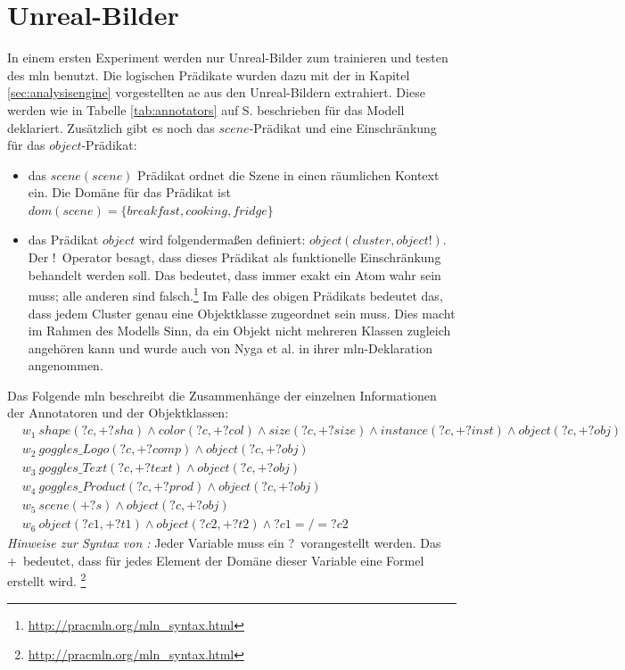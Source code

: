 \section{Unreal-Bilder}
\label{sec:onlyUnrealImages}
In einem ersten Experiment werden nur Unreal-Bilder zum trainieren und testen des \gls{mln} benutzt.  Die logischen Prädikate wurden dazu mit der in Kapitel \ref{sec:analysisengine} vorgestellten \gls{ae} aus den Unreal-Bildern extrahiert. Diese werden wie in Tabelle \ref{tab:annotators} auf S.\pageref{tab:annotators} beschrieben für das Modell deklariert. Zusätzlich gibt es noch das $scene$-Prädikat und eine Einschränkung für das $object$-Prädikat:
\begin{itemize}
\item das $scene(scene)$ Prädikat ordnet die Szene in einen räumlichen Kontext ein. Die Domäne für das Prädikat ist $dom(scene) = \{breakfast, cooking, fridge\}$
\item das Prädikat $object$ wird folgendermaßen definiert: $object(cluster, object!)$. Der \glqq!\grqq \ Operator besagt, dass dieses Prädikat als funktionelle Einschränkung behandelt werden soll. Das bedeutet, dass immer exakt ein Atom wahr sein muss; alle anderen sind falsch.\footnote{\url{http://pracmln.org/mln_syntax.html}} Im Falle des obigen Prädikats bedeutet das, dass jedem Cluster genau eine Objektklasse zugeordnet sein muss. Dies macht im Rahmen des Modells Sinn, da ein Objekt nicht mehreren Klassen zugleich angehören kann und wurde auch von Nyga et al.\cite{pr2looking} in ihrer \gls{mln}-Deklaration angenommen.
\end{itemize}
Das Folgende \gls{mln} beschreibt die Zusammenhänge der einzelnen Informationen der Annotatoren und der Objektklassen:
\begin{align*}
& w_{1} \ shape(?c, +?sha) \wedge color(?c, +?col) \wedge size(?c, +?size) \wedge instance(?c, +?inst) \wedge object(?c, +?obj) \\
& w_{2} \ goggles\_Logo(?c, +?comp) \wedge object(?c, +?obj)\\
& w_{3} \ goggles\_Text(?c, +?text) \wedge object(?c, +?obj)\\
& w_{4} \ goggles\_Product(?c, +?prod) \wedge object(?c, +?obj)\\
& w_{5} \ scene(+?s) \wedge object(?c, +?obj)\\
& w_{6} \ object(?c1, +?t1) \wedge object(?c2, +?t2) \wedge ?c1 =/= ?c2
\end{align*}
\textit{Hinweise zur Syntax von \pracmln:} Jeder Variable muss ein \glqq ?\grqq \ vorangestellt werden. Das \glqq +\grqq \ bedeutet, dass für jedes Element der Domäne dieser Variable eine Formel erstellt wird. \footnote{\url{http://pracmln.org/mln_syntax.html}}  \par
 
